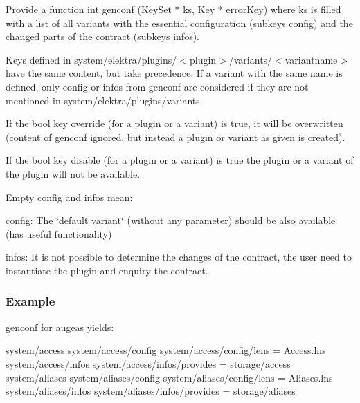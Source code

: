 \begin{DoxyEnumerate}
\item Provide a function {\ttfamily int genconf (Key\+Set $\ast$ ks, Key $\ast$ error\+Key)} where {\ttfamily ks} is filled with a list of all variants with the essential configuration (subkeys {\ttfamily config}) and the changed parts of the contract (subkeys {\ttfamily infos}).
\item Keys defined in {\ttfamily system/elektra/plugins/$<$plugin$>$/variants/$<$variantname$>$} have the same content, but take precedence. If a variant with the same name is defined, only {\ttfamily config} or {\ttfamily infos} from {\ttfamily genconf} are considered if they are not mentioned in {\ttfamily system/elektra/plugins/variants}.
\item If the bool key {\ttfamily override} (for a plugin or a variant) is true, it will be overwritten (content of {\ttfamily genconf} ignored, but instead a plugin or variant as given is created).
\item If the bool key {\ttfamily disable} (for a plugin or a variant) is true the plugin or a variant of the plugin will not be available.
\item Empty {\ttfamily config} and {\ttfamily infos} mean\+:
\begin{DoxyItemize}
\item {\ttfamily config}\+: The \char`\"{}default variant\char`\"{} (without any parameter) should be also available (has useful functionality)
\item {\ttfamily infos}\+: It is not possible to determine the changes of the contract, the user need to instantiate the plugin and enquiry the contract.
\end{DoxyItemize}
\end{DoxyEnumerate}

\subsubsection*{Example}

{\ttfamily genconf} for augeas yields\+:


\begin{DoxyCode}
system/access
system/access/config
system/access/config/lens = Access.lns
system/access/infos
system/access/infos/provides = storage/access
system/aliases
system/aliases/config
system/aliases/config/lens = Aliases.lns
system/aliases/infos
system/aliases/infos/provides = storage/aliases
\end{DoxyCode}


